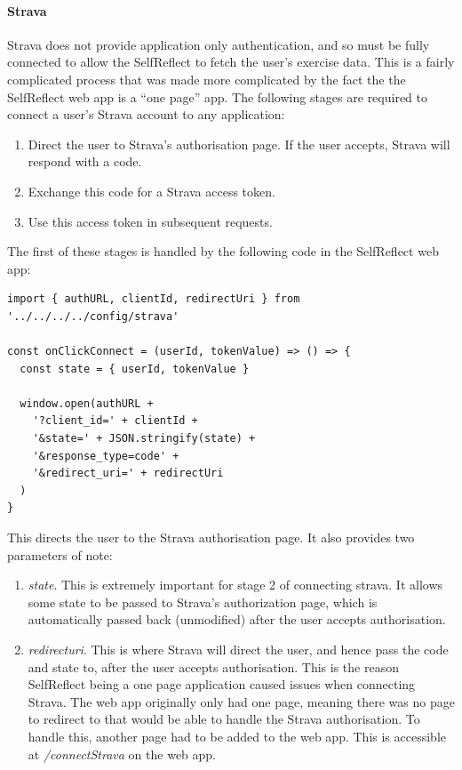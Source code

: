 \documentclass[11pt,openright,a4paper]{report}
\begin{document}
\paragraph{Strava} Strava does not provide application only authentication, and so must be fully connected to allow the SelfReflect to fetch the user's exercise data. This is a fairly complicated process that was made more complicated by the fact the the SelfReflect web app is a \enquote{one page} app. The following stages are required to connect a user's Strava account to any application:
\begin{enumerate}
\item Direct the user to Strava's authorisation page. If the user accepts, Strava will respond with a code.
\item Exchange this code for a Strava access token.
\item Use this access token in subsequent requests.
\end{enumerate}

\newpage
The first of these stages is handled by the following code in the SelfReflect web app:
\begin{lstlisting}
import { authURL, clientId, redirectUri } from '../../../../config/strava'

const onClickConnect = (userId, tokenValue) => () => {
  const state = { userId, tokenValue }

  window.open(authURL +
    '?client_id=' + clientId +
    '&state=' + JSON.stringify(state) +
    '&response_type=code' +
    '&redirect_uri=' + redirectUri
  )
}
\end{lstlisting}

This directs the user to the Strava authorisation page. It also provides two parameters of note:
\begin{enumerate}
\item \emph{state}. This is extremely important for stage 2 of connecting strava. It allows some state to be passed to Strava's authorization page, which is automatically passed back (unmodified) after the user accepts authorisation.
\item \emph{redirect\textunderscore uri}. This is where Strava will direct the user, and hence pass the code and state to, after the user accepts authorisation. This is the reason SelfReflect being a one page application caused issues when connecting Strava. The web app originally only had one page, meaning there was no page to redirect to that would be able to handle the Strava authorisation. To handle this, another page had to be added to the web app. This is accessible at \emph{/connectStrava} on the web app.
\end{enumerate}
\end{document}
